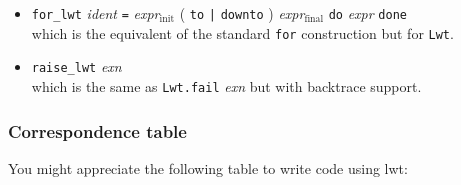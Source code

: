 \begin{itemize}
\item  {\tt for\_lwt} \emph{ident} {\tt =} \emph{expr$_{\mbox{init}}$} ( {\tt to} {\tt |}
{\tt downto} ) \emph{expr$_{\mbox{final}}$} {\tt do} \emph{expr}
{\tt done}
\mbox{}\\
which is the equivalent of the standard {\tt for} construction
but for {\tt Lwt}.

\end{itemize}

\begin{itemize}
\item  {\tt raise\_lwt} \emph{exn}
\mbox{}\\
which is the same as {\tt Lwt.fail} \emph{exn} but with backtrace support.

\end{itemize}

\subsubsection{ Correspondence table }

You might appreciate the following table to write code using lwt:



